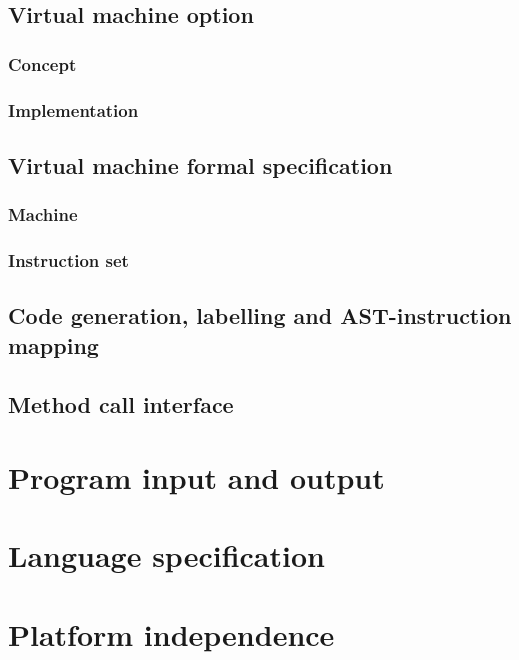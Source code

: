 \subsection{Virtual machine option}

\subsubsection{Concept}

\subsubsection{Implementation}

\subsection{Virtual machine formal specification}

\subsubsection{Machine}

\subsubsection{Instruction set}

\subsection{Code generation, labelling and AST-instruction mapping}

\subsection{Method call interface}

\section{Program input and output}

\section{Language specification}

\section{Platform independence}

